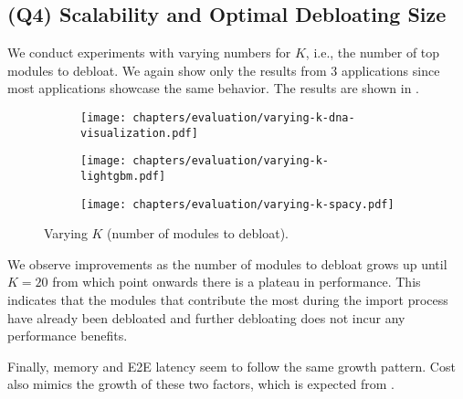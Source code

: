 \documentclass[sigplan,screen]{acmart}
\begin{document}
\subsection{(Q4) Scalability and Optimal Debloating Size}

We conduct experiments with varying numbers for $K$, i.e., the number of top modules to debloat.
We again show only the results from 3 applications since most applications showcase the same behavior.
The results are shown in .

\begin{figure}[t]
    \centering
\begin{subfigure}[b]{\linewidth}
        \centering
        \texttt{[image: chapters/evaluation/varying-k-dna-visualization.pdf]}
        \label{fig:k-dna}
    \end{subfigure}

    \vspace{-1em}

\begin{subfigure}[b]{\linewidth}
        \centering
        \texttt{[image: chapters/evaluation/varying-k-lightgbm.pdf]}
        \label{fig:k-lightgbm}
    \end{subfigure}

    \vspace{-1em}

\begin{subfigure}[b]{\linewidth}
        \centering
        \texttt{[image: chapters/evaluation/varying-k-spacy.pdf]}
        \label{fig:k-spacy}
    \end{subfigure}

    \vspace{-0.8em}
    
    \caption{Varying $K$ (number of modules to debloat).}
    \label{fig:varying-k}
\end{figure}

We observe improvements as the number of modules to debloat grows up until $K=20$ from which point onwards there is a plateau in performance.
This indicates that the modules that contribute the most during the import process have already been debloated and further debloating does not incur any performance benefits.

Finally, memory and E2E latency seem to follow the same growth pattern.
Cost also mimics the growth of these two factors, which is expected from . 
\end{document}
